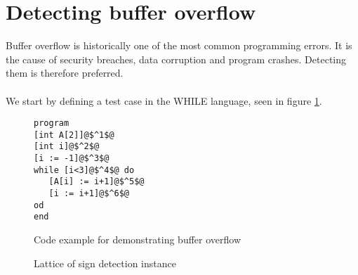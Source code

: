 \section{Detecting buffer overflow}
Buffer overflow is historically one of the most common programming errors. It is the cause of security breaches, data corruption and program crashes. Detecting them is therefore preferred.\\\\
We start by defining a test case in the WHILE language, seen in figure \ref{code:array_example}.
\begin{figure}
  \begin{lstlisting}
program
[int A[2]]@$^1$@
[int i]@$^2$@
[i := -1]@$^3$@
while [i<3]@$^4$@ do
   [A[i] := i+1]@$^5$@
   [i := i+1]@$^6$@
od
end
 \end{lstlisting}
 \label{code:array_example}
 \caption{Code example for demonstrating buffer overflow}
\end{figure}

 \begin{figure}[h]
 \centering
  \caption{Lattice of sign detection instance}
 
  \label{fig:sign_detection_lattice}
 \end{figure}

